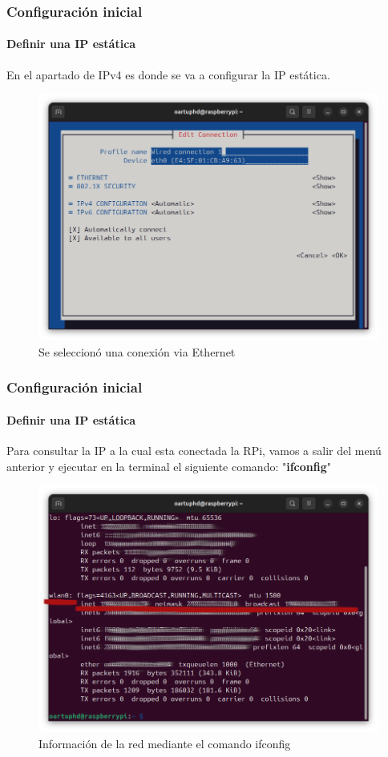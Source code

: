 \documentclass{beamer}
\begin{document}
	\begin{frame}
		\frametitle{Configuración inicial}
		\framesubtitle{Definir una IP estática}
		En el apartado de IPv4 es donde se va a configurar la IP estática.
		\begin{figure}
			\includegraphics[scale=0.25]{rpissh3.png}
			\caption{Se seleccionó una conexión via Ethernet}
		\end{figure}
	\end{frame}
	\begin{frame}
		\frametitle{Configuración inicial}
		\framesubtitle{Definir una IP estática}
		Para consultar la IP a la cual esta conectada la RPi, vamos a salir del menú anterior y ejecutar en la terminal el siguiente comando: "\textbf{ifconfig}"
		
		\begin{figure}
			\includegraphics[scale=0.25]{rpissh5.png}
			\caption{Información de la red mediante el comando ifconfig}
		\end{figure}
		
	\end{frame}
\end{document}
